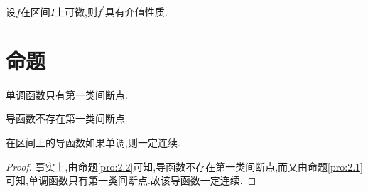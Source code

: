 \documentclass[lang=cn,newtx,10pt,scheme=chinese]{../Template/elegantbook}
\begin{document}
\begin{theorem}[$Darboux$定理]\label{Darboux定理}
设\(f\)在区间\(I\)上可微,则\(f^{\prime}\)具有介值性质.
\end{theorem}


\section{命题}

\begin{proposition}\label{pro:2.1}
单调函数只有第一类间断点.
\end{proposition}

\begin{proposition}\label{pro:2.2}
导函数不存在第一类间断点.
\end{proposition}

\begin{proposition}\label{pro:2.3}
在区间上的导函数如果单调,则一定连续.
\end{proposition}

\begin{proof}
事实上,由命题\ref{pro:2.2}可知,导函数不存在第一类间断点,而又由命题\ref{pro:2.1}可知,单调函数只有第一类间断点.故该导函数一定连续.

\end{proof}
\end{document}
